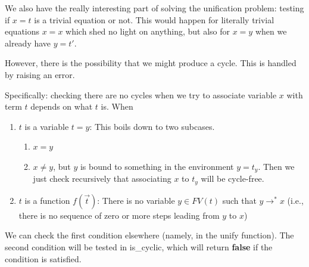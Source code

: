 \begin{node}
We also have the really interesting part of solving the unification
problem: testing if $x=t$ is a trivial equation or not. This would
happen for literally trivial equations $x=x$ which shed no light on anything,
but also for $x=y$ when we already have $y=t'$.

However, there is the possibility that we might produce a cycle. This
is handled by raising an error.

Specifically: checking there are no cycles when we try to associate
variable $x$ with term $t$ depends on what $t$ is. When
\begin{enumerate}
\item $t$ is a variable $t=y$: This boils down to two subcases.
  \begin{enumerate}
  \item $x=y$ 
  \item $x\neq y$, but $y$ is bound to something in the
    environment $y=t_{y}$. Then we just check recursively that associating $x$ to
    $t_{y}$ will be cycle-free.
  \end{enumerate}
\item $t$ is a function $f(\vec{t})$: There is no variable $y\in
  FV(t)$ such that $y\to^{*}x$ (i.e., there is no sequence of zero or more
  steps leading from $y$ to $x$)
\end{enumerate}
We can check the first condition elsewhere (namely, in the {\Tt{}unify\nwendquote}
function). The second condition will be tested in {\Tt{}is{\_}cyclic\nwendquote},
which will return \textbf{false} if the condition is satisfied.
\end{node}

